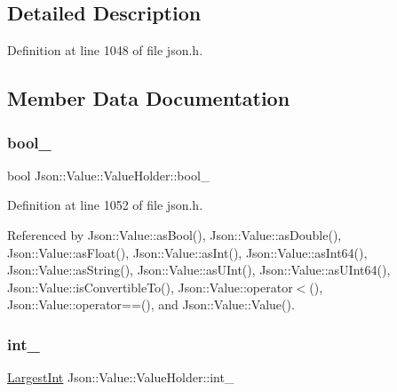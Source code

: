 \subsection{Detailed Description}


Definition at line 1048 of file json.\+h.



\subsection{Member Data Documentation}
\mbox{\label{union_json_1_1_value_1_1_value_holder_a92edab1861dadbfefd8be5fd4285eefe}} 
\subsubsection{\texorpdfstring{bool\+\_\+}{bool\_}}
{\footnotesize\ttfamily bool Json\+::\+Value\+::\+Value\+Holder\+::bool\+\_\+}



Definition at line 1052 of file json.\+h.



Referenced by Json\+::\+Value\+::as\+Bool(), Json\+::\+Value\+::as\+Double(), Json\+::\+Value\+::as\+Float(), Json\+::\+Value\+::as\+Int(), Json\+::\+Value\+::as\+Int64(), Json\+::\+Value\+::as\+String(), Json\+::\+Value\+::as\+U\+Int(), Json\+::\+Value\+::as\+U\+Int64(), Json\+::\+Value\+::is\+Convertible\+To(), Json\+::\+Value\+::operator$<$(), Json\+::\+Value\+::operator==(), and Json\+::\+Value\+::\+Value().

\mbox{\label{union_json_1_1_value_1_1_value_holder_adbfb384301298844ed955ba5cf6015a0}} 
\subsubsection{\texorpdfstring{int\+\_\+}{int\_}}
{\footnotesize\ttfamily \hyperlink{class_json_1_1_value_a1cbb82642ed05109b9833e49f042ece7}{Largest\+Int} Json\+::\+Value\+::\+Value\+Holder\+::int\+\_\+}



